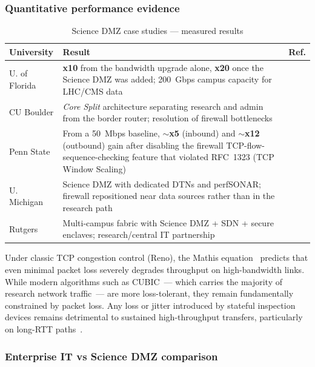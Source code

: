 \subsubsection{Quantitative performance evidence}

\begin{table}[H]
\centering
\caption{Science DMZ case studies --- measured results}
\label{tab:sdmz-cases}
\small
\begin{tabularx}{\textwidth}{l X l}
\toprule
\textbf{University} & \textbf{Result} & \textbf{Ref.} \\
\midrule
U. of Florida & \textbf{x10} from the bandwidth upgrade alone,
    \textbf{x20} once the Science DMZ was added; 200~Gbps campus
    capacity for LHC/CMS data &
    \cite{esnet-uflorida} \\
\addlinespace
CU Boulder & \emph{Core Split} architecture separating research and
    admin from the border router; resolution of firewall
    bottlenecks & \cite{esnet-cuboulder} \\
\addlinespace
Penn State & From a 50~Mbps baseline, \textbf{$\sim$x5} (inbound) and
    \textbf{$\sim$x12} (outbound) gain after disabling the firewall
    TCP-flow-sequence-checking feature that violated RFC~1323
    (TCP Window Scaling) & \cite{esnet-pennstate} \\
\addlinespace
U. Michigan & Science DMZ with dedicated DTNs and perfSONAR; firewall
    repositioned near data sources rather than in the research
    path & \cite{umich-sdmz} \\
\addlinespace
Rutgers & Multi-campus fabric with Science DMZ + SDN + secure
    enclaves; research/central IT partnership &
    \cite{rutgers-sdmz} \\
\bottomrule
\end{tabularx}
\end{table}

Under classic TCP congestion control (Reno), the Mathis
equation~\cite{mathis1997} predicts that even minimal packet loss
severely degrades throughput on high-bandwidth links. While modern
algorithms such as CUBIC~--- which carries the majority of research
network traffic~--- are more loss-tolerant, they remain fundamentally
constrained by packet loss. Any loss or jitter introduced by stateful inspection
devices remains detrimental to sustained high-throughput transfers,
particularly on long-RTT paths~\cite{sciencedmz-perf}.

\subsubsection{Enterprise IT vs Science DMZ comparison}

